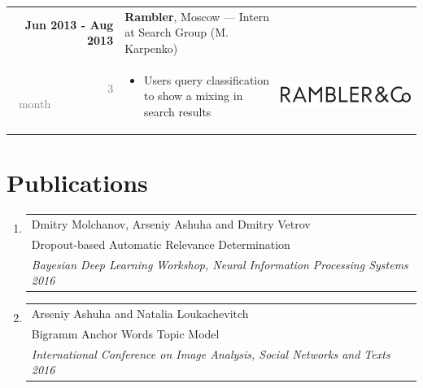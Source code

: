 \documentclass[a4paper,10pt]{article} %
\begin{document}
\begin{tabular}{r|p{11.5cm}c}
\textbf{Jun 2013 - Aug 2013} & \textbf{Rambler}, Moscow --- Intern at Search Group \footnotesize{(M. Karpenko)}\\ 
\textcolor{gray}{3 month}~~~~~~~~~~~& 
\footnotesize{

\vspace{-0.25cm}
\begin{itemize}
	\item Users query classification to show a mixing in search results
\end{itemize}
\vspace{-0.3cm}
}
& \multirow{2}{*}{\includegraphics[scale=0.12]{img/ramblerco}}\\
\end{tabular}

\section{Publications}
\begin{enumerate}
	\item \begin{tabular}{p{18cm}}	
		Dmitry Molchanov, Arseniy Ashuha and Dmitry Vetrov \\
		{Dropout-based Automatic Relevance Determination} \\
		\emph{Bayesian Deep Learning Workshop, Neural Information Processing Systems 2016} 
	\end{tabular}

	\item \begin{tabular}{p{18cm}}	
		Arseniy Ashuha and Natalia Loukachevitch\\
		Bigramm Anchor Words Topic Model \\
		\emph{International Conference on Image Analysis, Social Networks and Texts 2016}
	\end{tabular}
\end{enumerate}
\end{document}
